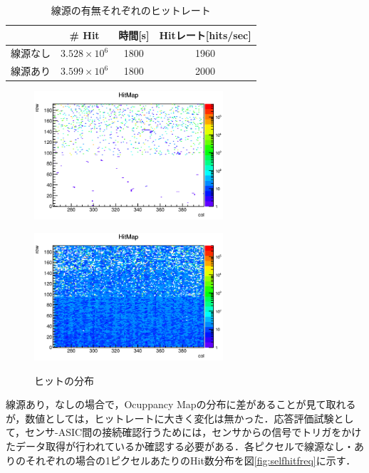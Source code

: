 \begin{table}[h]
  \centering
  \caption{線源の有無それぞれのヒットレート}
  \begin{tabular} {|l|c|c||c|} \hline
     & \# Hit & 時間[s] & Hitレート[hits/sec] \\  \hline
    線源なし & $3.528 \times 10^6$ & 1800 & 1960 \\ 
    線源あり & $3.599 \times 10^6$ & 1800 & 2000 \\ \hline
  \end{tabular}
  \label{tab:self}
\end{table}

\begin{figure}[h]
  \centering
  \begin{minipage}[b]{0.45\linewidth}
    \centering
    \includegraphics[width=7cm]{./figure/selftrigwo.png}
    \label{fig:selfwo}
  \end{minipage}
  \begin{minipage}[b]{0.45\linewidth}
    \centering
    \includegraphics[width=7cm]{./figure/selftrigw.png}
    \label{fig:selfo}
  \end{minipage}
  \caption{ヒットの分布}
  \label{fig:self}
\end{figure}

線源あり，なしの場合で，Ocuppancy Mapの分布に差があることが見て取れるが，数値としては，ヒットレートに大きく変化は無かった．応答評価試験として，センサ-ASIC間の接続確認行うためには，センサからの信号でトリガをかけたデータ取得が行われているか確認する必要がある．各ピクセルで線源なし・ありのそれぞれの場合の1ピクセルあたりのHit数分布を図\ref{fig:selfhitfreq}に示す．

